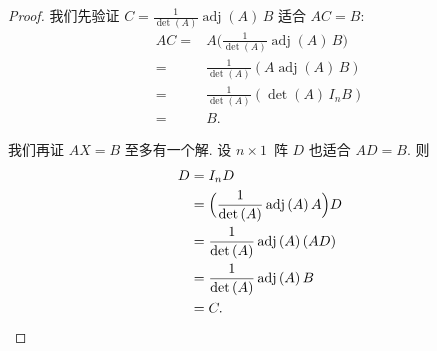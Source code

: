 \begin{proof}
    我们先验证
    \(C = \frac{1}{\det {(A)}} \operatorname{adj} {(A)}\,B\)
    适合 \(AC = B\):
    \begin{align*}
        AC
        = {} & A\Big( \frac{1}{\det {(A)}}
        \operatorname{adj} {(A)}\,B \Big)
        \\
        = {} & \frac{1}{\det {(A)}} (A\operatorname{adj} {(A)}\,B)
        \\
        = {} & \frac{1}{\det {(A)}} (\det {(A)}\,I_n B)
        \\
        = {} & B.
    \end{align*}

    我们再证 \(AX = B\) 至多有一个解.
    设 \(n \times 1\)~阵 \(D\) 也适合 \(AD = B\).
    则
    \begin{align*}
        D
        = {} & I_n D
        \\
        = {} & \Big( \frac{1}{\det {(A)}}
        \operatorname{adj} {(A)}\,A \Big) D
        \\
        = {} & \frac{1}{\det {(A)}}
        \operatorname{adj} {(A)}\, (AD)
        \\
        = {} & \frac{1}{\det {(A)}}
        \operatorname{adj} {(A)}\,B
        \\
        = {} & C.
        \qedhere
    \end{align*}
\end{proof}

